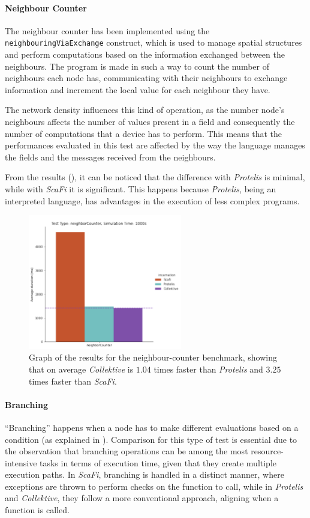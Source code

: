 \paragraph{Neighbour Counter}
The neighbour counter has been implemented using the \texttt{neighbouringViaExchange} construct, which is used to
manage spatial structures and perform computations based on the information exchanged between the neighbours.
The program is made in such a way to count the number of neighbours each node has, communicating with their neighbours
to exchange information and increment the local value for each neighbour they have.

The network density influences this kind of operation, as the number node's neighbours affects the number of
values present in a field and consequently the number of computations that a device has to perform.
This means that the performances evaluated in this test are affected by the way the language manages the fields and the
messages received from the neighbours.

From the results (), it can be noticed that the difference with \emph{Protelis} is minimal,
while with \emph{ScaFi} it is significant.
This happens because \emph{Protelis}, being an interpreted language, has advantages in the execution of less complex programs.

\begin{figure}[ht!]
    \centering
    \includegraphics[width=0.6\textwidth]{figures/neighboring-results}
    \caption{Graph of the results for the neighbour-counter benchmark, showing that on average \emph{Collektive} is $1.04$ times faster
    than \emph{Protelis} and $3.25$ times faster than \emph{ScaFi}.}
    \label{fig:neghbour-counter}
\end{figure}

\paragraph{Branching}
``Branching'' happens when a node has to make different evaluations based on a condition (as explained in ).
Comparison for this type of test is essential due to the observation that branching operations can be among the most
resource-intensive tasks in terms of execution time, given that they create multiple execution paths.
In \emph{ScaFi}, branching is handled in a distinct manner, where exceptions are thrown to perform checks on the function to call,
while in \emph{Protelis} and \emph{Collektive}, they follow a more conventional approach, aligning when a function is called.

